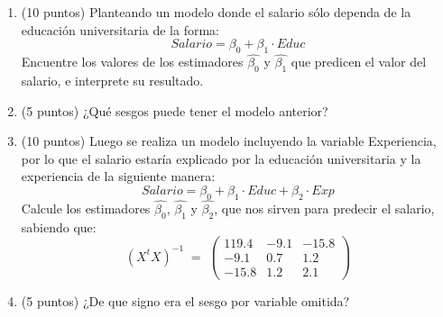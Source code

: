 \documentclass[10pt,a4paper]{article}
\begin{document}
\begin{enumerate}
\begin{enumerate}
    \item (10 puntos) Planteando un modelo donde el salario sólo dependa de la educación universitaria de la forma:
    $$Salario = \beta_0 + \beta_1 \cdot Educ$$
    Encuentre los valores de los estimadores $\hat{\beta_0}$ y $\hat{\beta_1}$ que predicen el valor del salario, e interprete su resultado.

    \item (5 puntos) ¿Qué sesgos puede tener el modelo anterior?


    \item (10 puntos) Luego se realiza un modelo incluyendo la variable Experiencia, por lo que el salario estaría explicado por la educación universitaria y la experiencia de la siguiente manera:
    $$Salario = \beta_0 + \beta_1 \cdot Educ + \beta_2 \cdot Exp$$
    Calcule los estimadores $\hat{\beta_0}$, $\hat{\beta_1}$ y $\hat{\beta_2}$, que nos sirven para predecir el salario, sabiendo que:
    \[
(X^tX)^{-1} \;=\;
\begin{pmatrix}
119.4 & -9.1 & -15.8 \\
-9.1 & 0.7 & 1.2 \\
-15.8 & 1.2 & 2.1
\end{pmatrix}
\]

    \item (5 puntos) ¿De que signo era el sesgo por variable omitida?

\end{enumerate}

\end{enumerate}
\end{document}

